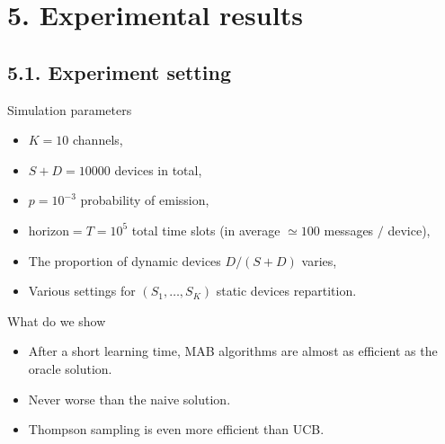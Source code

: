 \section{\hfill{}5. Experimental results\hfill{}}

\subsection{\hfill{}5.1. Experiment setting\hfill{}}

\begin{frameO}

    \begin{colorblock}{Simulation parameters}

        \begin{itemize}
            \tightlist
            \item
                  \(K = 10\) channels,
            \item
                  \(S + D = 10000\) devices in total,
            \item
                  \(p = 10^{-3}\) probability of emission,
            \item
                  \(\text{horizon} = T = 10^5\) total time slots (in average \(\simeq 100\) messages \(/\)
                  device),
            \item
                  The proportion of dynamic devices \(D/(S+D)\) varies,
            \item
                  Various settings for \((S_1,\dots,S_{K})\) static devices
                  repartition.
        \end{itemize}

    \end{colorblock}

    \begin{colorblock}{What do we show}

        \begin{itemize}
            \tightlist
            \item
                  After a short learning time, MAB algorithms are almost as efficient as
                  the oracle solution.
            \item
                  Never worse than the naive solution.
            \item
                  Thompson sampling is even more efficient than UCB.
        \end{itemize}

    \end{colorblock}

\end{frameO}



